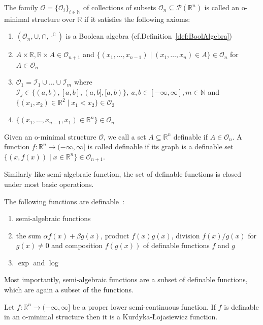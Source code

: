 \begin{definition}
The family $\mathcal{O}=\{\mathcal{O}_i\}_{i\in\mathbb{N}}$ of collections of subsets $\mathcal{O}_n\subseteq\mathcal{P}(\mathbb{R}^n)$ is called an o-minimal structure over $\mathbb{R}$ if it satisfies the following axioms:
\begin{enumerate}
    \item $(\mathcal{O}_n,\cup, \cap,\cdot^\complement)$ is a Boolean algebra (cf.\@ Definition~\ref{def:BoolAlgebra})
    \item $A\times\mathbb{R},\mathbb{R}\times A\in\mathcal{O}_{n+1}$ and $\{(x_1,\ldots, x_{n-1})\mid (x_1,\ldots,x_n)\in A\}\in \mathcal{O}_{n}$ for $A\in\mathcal{O}_{n}$ 
    \item $\mathcal{O}_1=\mathcal{I}_1\cup\ldots\cup \mathcal{I}_m$ where $\mathcal{I}_j\in\{(a,b),[a,b],(a,b],[a,b)\},\ a,b\in[-\infty,\infty], m\in\mathbb{N}$ and $\{(x_1,x_2)\in\mathbb{R}^2\mid x_1<x_2\}\in\mathcal{O}_2$
    \item $\{(x_1,\ldots,x_{n-1},x_1)\in\mathbb{R}^n\}\in\mathcal{O}_n$
\end{enumerate}
Given an o-minimal structure $\mathcal{O}$, we call a set $A\subseteq\mathbb{R}^n$ definable if $A\in\mathcal{O}_n$. A function $f:\mathbb{R}^{n}\rightarrow (-\infty,\infty]$ is called definable if its graph is a definable set $\{(x,f(x))\mid x\in\mathbb{R}^n\}\in\mathcal{O}_{n+1}$.
\end{definition}
Similarly like semi-algebraic function, the set of definable functions is closed under most basic operations.
\begin{example}The following functions are definable~\citep{dries1998tame}:
\begin{enumerate}
    \item semi-algebraic functions
    \item the sum $\alpha f(x)+\beta g(x)$, product $f(x)g(x)$, division $f(x)/g(x)$ for $g(x)\neq0$ and composition $f(g(x))$ of definable functions $f$ and $g$
    \item $\exp$ and $\log$
\end{enumerate}
\end{example}
Most importantly, semi-algebraic functions are a subset of definable functions, which are again a subset of the \KL functions.
\begin{theorem}{{\citep{attouch2010proximal}}}
Let $f:\mathbb{R}^n\rightarrow (-\infty,\infty]$ be a proper lower semi-continuous function. If $f$ is definable in an o-minimal structure then it is a Kurdyka-{\L}ojasiewicz function.
\end{theorem}
